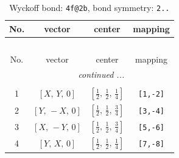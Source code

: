 \documentclass[fleqn,8pt]{jsarticle}
\begin{document}
\renewcommand{\arraystretch}{1.2}
\begin{longtable}{cccc}
\caption{Wyckoff bond: {\tt 4f@2b}, bond symmetry: {\tt 2..}}
 \\
 \hline \hline
No. & vector & center & mapping \\ \hline \endfirsthead

\multicolumn{3}{l}{\tablename\ \thetable{}} \\
 \hline \hline
No. & vector & center & mapping \\ \hline \endhead

 \hline \hline
\multicolumn{3}{r}{\footnotesize\it continued ...} \\ \endfoot

 \hline \hline
\multicolumn{3}{r}{} \\ \endlastfoot

1 & $\left[ X,\, Y,\, 0 \right]$ & $\left[ \frac{1}{2},\, \frac{1}{2},\, \frac{1}{4} \right]$ & {\tt [1,-2]} \\ \hline
2 & $\left[ Y,\, - X,\, 0 \right]$ & $\left[ \frac{1}{2},\, \frac{1}{2},\, \frac{3}{4} \right]$ & {\tt [3,-4]} \\ \hline
3 & $\left[ X,\, - Y,\, 0 \right]$ & $\left[ \frac{1}{2},\, \frac{1}{2},\, \frac{3}{4} \right]$ & {\tt [5,-6]} \\ \hline
4 & $\left[ Y,\, X,\, 0 \right]$ & $\left[ \frac{1}{2},\, \frac{1}{2},\, \frac{1}{4} \right]$ & {\tt [7,-8]} \\
\end{longtable}
\renewcommand{\arraystretch}{1.2}
\end{document}
